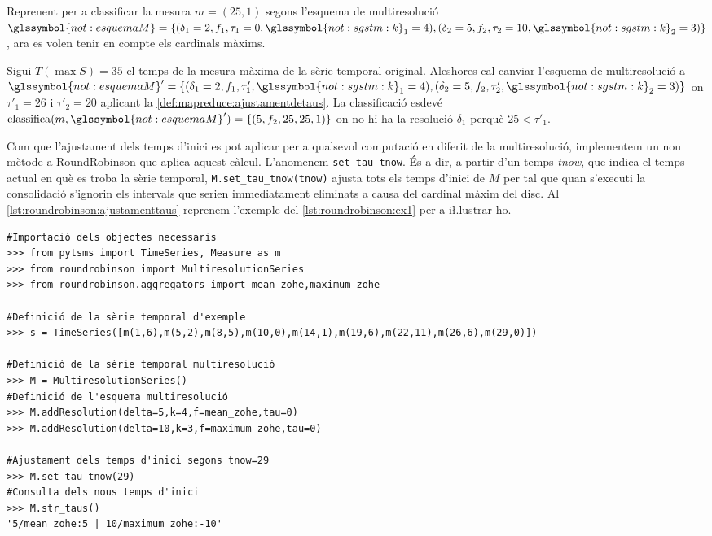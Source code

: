 \begin{example}
  \label{ex:mapreduce:classifica-ajustament}
  Reprenent  per a
  classificar la mesura $m=(25,1)$ segons l'esquema de multiresolució
  $\glssymbol{not:esquemaM}=\{(\delta_1=2,f_1,\tau_1=0,
  \glssymbol{not:sgstm:k}_1=4), (\delta_2=5,f_2,\tau_2=10,
  \glssymbol{not:sgstm:k}_2=3)\}$, ara es volen tenir en compte els
  cardinals màxims.
    
  Sigui $T(\max S)=35$ el temps de la mesura màxima de la sèrie
  temporal original. Aleshores cal canviar l'esquema de multiresolució
  a $\glssymbol{not:esquemaM}'=\{(\delta_1=2,f_1,\tau'_1,
  \glssymbol{not:sgstm:k}_1=4),
  (\delta_2=5,f_2,\tau'_2,\glssymbol{not:sgstm:k}_2=3)\}$ on
  $\tau'_1=26$ i $\tau'_2=20$ aplicant la
  \autoref{def:mapreduce:ajustamentdetaus}. La classificació esdevé
  $\operatorname{classifica}(m,\glssymbol{not:esquemaM}')=\{
  (5,f_2,25,25,1) \}$ on no hi ha la resolució $\delta_1$ perquè $25<
  \tau'_1$.
\end{example}




Com que l'ajustament dels temps d'inici es pot aplicar per a qualsevol
computació en diferit de la multiresolució, implementem un nou mètode
a RoundRobinson que aplica aquest càlcul. L'anomenem
\lstinline[style=py]+set_tau_tnow+. És a dir, a partir d'un temps
\emph{tnow}, que indica el temps actual en què es troba la sèrie
temporal, \lstinline[style=py]+M.set_tau_tnow(tnow)+ ajusta tots els
temps d'inici de $M$ per tal que quan s'executi la consolidació
s'ignorin els intervals que serien immediatament eliminats a causa del
cardinal màxim del disc.  Al
\autoref{lst:roundrobinson:ajustamenttaus} reprenem l'exemple del
\autoref{lst:roundrobinson:ex1} per a i\l.lustrar-ho.

\begin{lstlisting}[style=py,caption=Exemple d'ajustament dels temps
    d'inici amb RoundRobinson,label=lst:roundrobinson:ajustamenttaus]
#Importació dels objectes necessaris
>>> from pytsms import TimeSeries, Measure as m
>>> from roundrobinson import MultiresolutionSeries
>>> from roundrobinson.aggregators import mean_zohe,maximum_zohe

#Definició de la sèrie temporal d'exemple
>>> s = TimeSeries([m(1,6),m(5,2),m(8,5),m(10,0),m(14,1),m(19,6),m(22,11),m(26,6),m(29,0)])

#Definició de la sèrie temporal multiresolució
>>> M = MultiresolutionSeries()
#Definició de l'esquema multiresolució
>>> M.addResolution(delta=5,k=4,f=mean_zohe,tau=0)
>>> M.addResolution(delta=10,k=3,f=maximum_zohe,tau=0)

#Ajustament dels temps d'inici segons tnow=29
>>> M.set_tau_tnow(29)
#Consulta dels nous temps d'inici
>>> M.str_taus()
'5/mean_zohe:5 | 10/maximum_zohe:-10'
\end{lstlisting}


